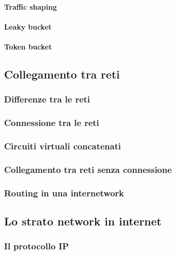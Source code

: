 \paragraph{Traffic shaping}

\paragraph{Leaky bucket}

\paragraph{Token bucket}

\subsection{Collegamento tra reti}

\subsubsection{Differenze tra le reti}

\subsubsection{Connessione tra le reti}

\subsubsection{Circuiti virtuali concatenati}

\subsubsection{Collegamento tra reti senza connessione}

\subsubsection{Routing in una internetwork}

\subsection{Lo strato network in internet}

\subsubsection{Il protocollo IP}

